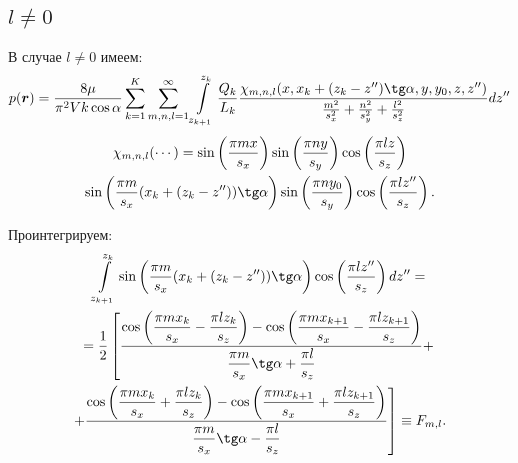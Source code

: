 \documentclass[a4paper,12pt]{article}
\begin{document}
\subsection*{$l \neq 0$}
	В случае $l \neq 0$ имеем:
\begin{equation}
	\label{eqn6}
	p(\boldsymbol{r}) = \frac{8\mu}{\pi^2 V k \cos{\alpha}}\sum\limits_{k=1}^K \sum\limits_{m, n, l = 1}^{\infty} \int\limits_{z_{k+1}}^{z_k}
	\frac{Q_k}{L_k}
	\frac{\chi_{m, n, l}(x, x_k+(z_k-z'')\tg\alpha, y, y_0, z, z'')}{\frac{m^2}{s_x^2} + \frac{n^2}{s_y^2} + \frac{l^2}{s_z^2}}dz''
\end{equation}
\begin{multline}
	\label{eqn7}
	\chi_{m, n, l}(\cdots) = \sin\left(\frac{\pi m x}{s_x}\right)\sin\left(\frac{\pi n y}{s_y}\right)\cos\left(\frac{\pi l z}{s_z}\right)\\
	 \sin\left(\frac{\pi m}{s_x}(x_k + (z_k-z''))\tg \alpha\right)\sin\left(\frac{\pi n y_0}{s_y}\right)\cos\left(\frac{\pi l z''}{s_z}\right).
\end{multline}

	Проинтегрируем:
\begin{multline}
	\label{eqn8}
	\int\limits_{z_{k+1}}^{z_{k}} \sin\left(\frac{\pi m}{s_x}(x_k + (z_{k}-z''))\tg \alpha\right)\cos\left(\frac{\pi l z''}{s_z}\right)dz'' = \\ =\frac{1}{2}
	\left[\frac{\cos\left(\displaystyle\frac{\pi m x_{k}}{s_x} - \displaystyle\frac{\pi l z_{k}}{s_z}\right)
	- \cos\left(\displaystyle\frac{\pi m x_{k+1}}{s_x} - \displaystyle\frac{\pi l z_{k+1}}{s_z}\right)}{\displaystyle\frac{\pi m}{s_x}\tg \alpha + \displaystyle\frac{\pi l}{s_z}} +\right. \\
	\left.+\frac{\cos\left(\displaystyle\frac{\pi m x_{k}}{s_x} + \displaystyle\frac{\pi l z_{k}}{s_z}\right)
	- \cos\left(\displaystyle\frac{\pi m x_{k+1}}{s_x} + \displaystyle\frac{\pi l z_{k+1}}{s_z}\right)}{\displaystyle\frac{\pi m}{s_x}\tg \alpha - \displaystyle\frac{\pi l}{s_z}}\right] \equiv F_{m, l}.
\end{multline}
\end{document}
